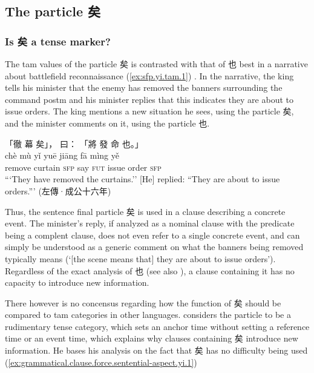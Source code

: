 \documentclass[UTF8, a4paper, oneside, scheme=plain, 12pt]{ctexrep}
\newcommand*{\citepages}[1]{pp.~{#1}}
\newcommand{\translate}[1]{`#1'}
\newcommand*{\category}[1]{\textsc{#1}}
\begin{document}
\subsection{The particle 矣}

\subsubsection{Is 矣 a tense marker?}\label{sec:sfp.yi.not-tense}

The \ac{tam} values of the particle 矣 is contrasted with that of 也 best in a narrative about  battlefield reconnaissance (\ref{ex:sfp.yi.tam.1})
\citep[\citepages{444-445}]{meiguang2018}.
In the narrative, the king tells his minister that the enemy has removed the banners surrounding the command postm and his minister replies that this indicates they are about to issue orders. 
The king mentions a new situation he sees, using the particle 矣,
and the minister comments on it, using the particle 也.

\begin{exe}
    \ex\label{ex:sfp.yi.tam.1}
    \glll 「徹 幕 矣」， 曰： 「將 發 命 也。」 \\
    chè mù yǐ yuē jiāng fā mìng yě \\
    remove curtain \category{sfp} say \category{fut} issue order \category{sfp} \\
    \glt\translate{``They have removed the curtains.'' [He] replied: ``They are about to issue orders.''} \hfill (左傳·成公十六年)
\end{exe}

Thus, the sentence final particle 矣 is used in a clause describing a concrete event.
The minister's reply, if analyzed as a nominal clause with the predicate being a complent clause,
does not even refer to a single concrete event,
and can simply be understood as a generic comment on what the banners being removed typically means (\translate{[the scene means that] they are about to issue orders}).
Regardless of the exact analysis of 也 (see also ), a clause containing it has no capacity to introduce new information.

There however is no concensus regarding how the function of 矣 should be compared to \ac{tam} categories in other languages.
\citep[\citepages{443-445}]{meiguang2018} considers the particle to be a rudimentary tense category, which sets an anchor time without setting a reference time or an event time,
which explains why clauses containing 矣 introduce new information.
He bases his analysis on the fact that 矣 has no difficulty being used 
(\ref{ex:grammatical.clause.force.sentential-aspect.yi.1})
\end{document}
